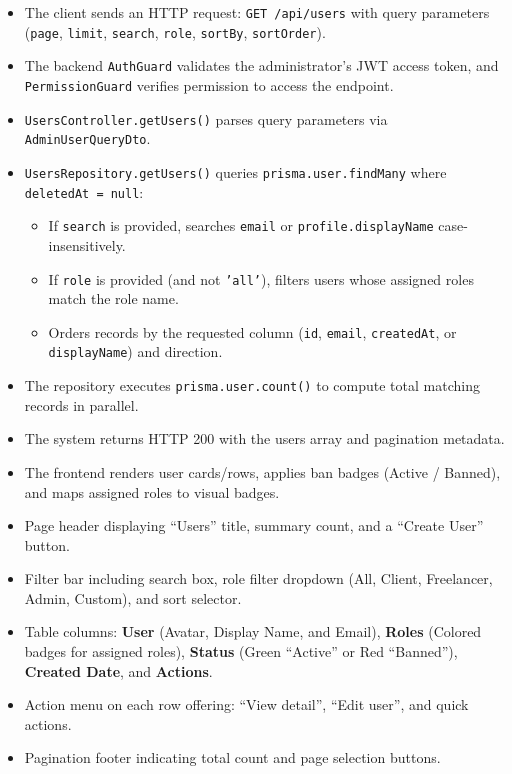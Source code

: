 \begin{itemize}[leftmargin=1.6em,topsep=3pt,itemsep=2pt,parsep=0pt,label=$\bullet$]
    \item The client sends an HTTP request: \texttt{GET /api/users} with query parameters (\texttt{page}, \texttt{limit}, \texttt{search}, \texttt{role}, \texttt{sortBy}, \texttt{sortOrder}).
    \item The backend \texttt{AuthGuard} validates the administrator's JWT access token, and \texttt{PermissionGuard} verifies permission to access the endpoint.
    \item \texttt{UsersController.getUsers()} parses query parameters via \texttt{AdminUserQueryDto}.
    \item \texttt{UsersRepository.getUsers()} queries \texttt{prisma.user.findMany} where \texttt{deletedAt = null}:
        \begin{itemize}[leftmargin=1.6em,topsep=2pt,itemsep=2pt,parsep=0pt]
            \item If \texttt{search} is provided, searches \texttt{email} or \texttt{profile.displayName} case-insensitively.
            \item If \texttt{role} is provided (and not \texttt{'all'}), filters users whose assigned roles match the role name.
            \item Orders records by the requested column (\texttt{id}, \texttt{email}, \texttt{createdAt}, or \texttt{displayName}) and direction.
        \end{itemize}
    \item The repository executes \texttt{prisma.user.count()} to compute total matching records in parallel.
    \item The system returns HTTP 200 with the users array and pagination metadata.
    \item The frontend renders user cards/rows, applies ban badges (Active / Banned), and maps assigned roles to visual badges.
\end{itemize}

\begin{itemize}[leftmargin=1.6em,topsep=3pt,itemsep=2pt,parsep=0pt,label=$\bullet$]
    \item Page header displaying ``Users'' title, summary count, and a ``Create User'' button.
    \item Filter bar including search box, role filter dropdown (All, Client, Freelancer, Admin, Custom), and sort selector.
    \item Table columns: \textbf{User} (Avatar, Display Name, and Email), \textbf{Roles} (Colored badges for assigned roles), \textbf{Status} (Green ``Active'' or Red ``Banned''), \textbf{Created Date}, and \textbf{Actions}.
    \item Action menu on each row offering: ``View detail'', ``Edit user'', and quick actions.
    \item Pagination footer indicating total count and page selection buttons.
\end{itemize}

